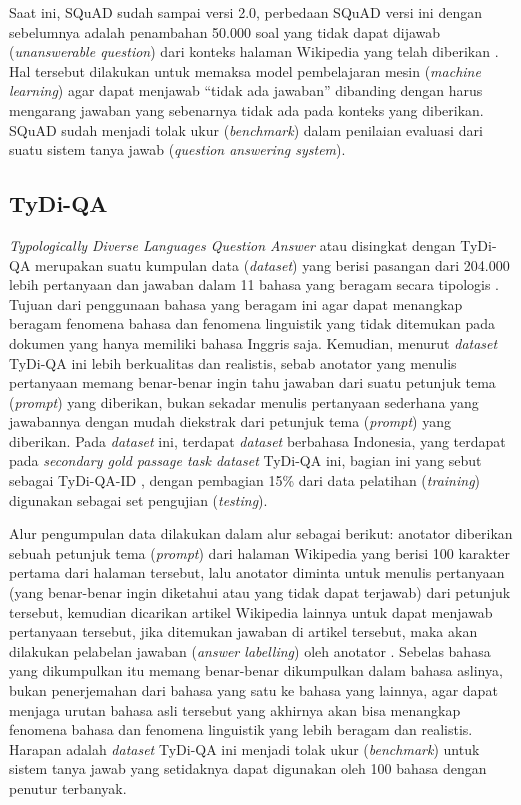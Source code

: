 Saat ini, SQuAD sudah sampai versi 2.0, perbedaan SQuAD versi ini dengan sebelumnya adalah penambahan 50.000 soal yang tidak dapat dijawab (\emph{unanswerable question}) dari konteks halaman Wikipedia yang telah diberikan \citep{rajpurkar-etal-2018-know}. Hal tersebut dilakukan untuk memaksa model pembelajaran mesin (\emph{machine learning}) agar dapat menjawab “tidak ada jawaban” dibanding dengan harus mengarang jawaban yang sebenarnya tidak ada pada konteks yang diberikan. SQuAD sudah menjadi tolak ukur (\emph{benchmark}) dalam penilaian evaluasi dari suatu sistem tanya jawab (\emph{question answering system}).

\subsection{TyDi-QA}
\emph{Typologically Diverse Languages Question Answer} atau disingkat dengan TyDi-QA merupakan suatu kumpulan data (\emph{dataset}) yang berisi pasangan dari 204.000 lebih pertanyaan dan jawaban dalam 11 bahasa yang beragam secara tipologis \citep{clark-etal-2020-tydi}. Tujuan dari penggunaan bahasa yang beragam ini agar dapat menangkap beragam fenomena bahasa dan fenomena linguistik yang tidak ditemukan pada dokumen yang hanya memiliki bahasa Inggris saja. Kemudian, menurut \citet{clark-etal-2020-tydi} \emph{dataset} TyDi-QA ini lebih berkualitas dan realistis, sebab anotator yang menulis pertanyaan memang benar-benar ingin tahu jawaban dari suatu petunjuk tema (\emph{prompt}) yang diberikan, bukan sekadar menulis pertanyaan sederhana yang jawabannya dengan mudah diekstrak dari petunjuk tema (\emph{prompt}) yang diberikan. Pada \emph{dataset} ini, terdapat \emph{dataset} berbahasa Indonesia, yang terdapat pada \emph{secondary gold passage task dataset} TyDi-QA ini, bagian ini yang \citet{cahyawijaya-etal-2021-indonlg} sebut sebagai TyDi-QA-ID , dengan pembagian 15\% dari data pelatihan (\emph{training}) digunakan sebagai set pengujian (\emph{testing}).

Alur pengumpulan data dilakukan dalam alur sebagai berikut: anotator diberikan sebuah petunjuk tema (\emph{prompt}) dari halaman Wikipedia yang berisi 100 karakter pertama dari halaman tersebut, lalu anotator diminta untuk menulis pertanyaan (yang benar-benar ingin diketahui atau yang tidak dapat terjawab) dari petunjuk tersebut, kemudian dicarikan artikel Wikipedia lainnya untuk dapat menjawab pertanyaan tersebut, jika ditemukan jawaban di artikel tersebut, maka akan dilakukan pelabelan jawaban (\emph{answer labelling}) oleh anotator \citep{clark-etal-2020-tydi}. Sebelas bahasa yang dikumpulkan itu memang benar-benar dikumpulkan dalam bahasa aslinya, bukan penerjemahan dari bahasa yang satu ke bahasa yang lainnya, agar dapat menjaga urutan bahasa asli tersebut yang akhirnya akan bisa menangkap fenomena bahasa dan fenomena linguistik yang lebih beragam dan realistis. Harapan \citet{clark-etal-2020-tydi} adalah \emph{dataset} TyDi-QA ini menjadi tolak ukur (\emph{benchmark}) untuk sistem tanya jawab yang setidaknya dapat digunakan oleh 100 bahasa dengan penutur terbanyak.

